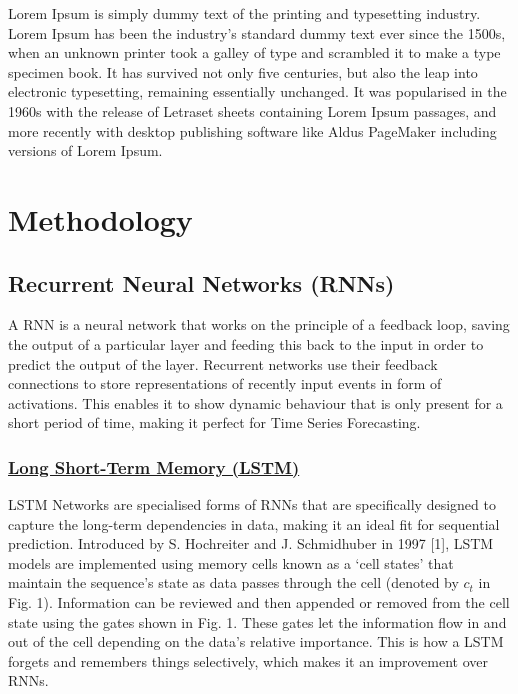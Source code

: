 \documentclass[conference]{IEEEtran}
\begin{document}
Lorem Ipsum is simply dummy text of the printing and typesetting industry. Lorem Ipsum has been the industry's standard dummy text ever since the 1500s, when an unknown printer took a galley of type and scrambled it to make a type specimen book. It has survived not only five centuries, but also the leap into electronic typesetting, remaining essentially unchanged. It was popularised in the 1960s with the release of Letraset sheets containing Lorem Ipsum passages, and more recently with desktop publishing software like Aldus PageMaker including versions of Lorem Ipsum.

\section{Methodology}

\subsection{Recurrent Neural Networks (RNNs)}

A RNN is a neural network that works on the principle of a feedback loop, saving the output of a particular layer and feeding this back to the input in order to predict the output of the layer. Recurrent networks use their feedback connections to store representations of recently input events in form of activations. This enables it to show dynamic behaviour that is only present for a short period of time, making it perfect for Time Series Forecasting.

\vspace{5pt} %

\subsubsection{\textbf{\ul{Long Short-Term Memory (LSTM)}}}

LSTM Networks are specialised forms of RNNs that are specifically designed to capture the long-term dependencies in data, making it an ideal fit for sequential prediction. Introduced by S. Hochreiter and J. Schmidhuber in 1997 [1], LSTM models are implemented using memory cells known as a ‘cell states’ that maintain the sequence's state as data passes through the cell (denoted by $c_{t}$ in Fig. 1). Information can be reviewed and then appended or removed from the cell state using the gates shown in Fig. 1. These gates let the information flow in and out of the cell depending on the data's relative importance. This is how a LSTM forgets and remembers things selectively, which makes it an improvement over RNNs.
\end{document}

